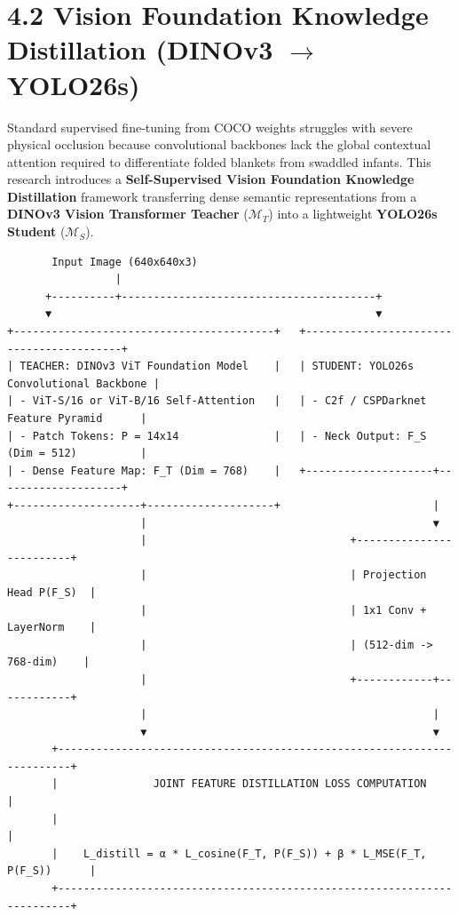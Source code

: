 \section{\texorpdfstring{4.2 Vision Foundation Knowledge Distillation
(DINOv3 \(\to\)
YOLO26s)}{4.2 Vision Foundation Knowledge Distillation (DINOv3 \textbackslash to YOLO26s)}}\label{vision-foundation-knowledge-distillation-dinov3-to-yolo26s}

Standard supervised fine-tuning from COCO weights struggles with severe
physical occlusion because convolutional backbones lack the global
contextual attention required to differentiate folded blankets from
swaddled infants. This research introduces a \textbf{Self-Supervised
Vision Foundation Knowledge Distillation} framework transferring dense
semantic representations from a \textbf{DINOv3 Vision Transformer
Teacher} (\(\mathcal{M}_T\)) into a lightweight \textbf{YOLO26s Student}
(\(\mathcal{M}_S\)).

\begin{verbatim}
       Input Image (640x640x3)
                 |
      +----------+----------------------------------------+
      ▼                                                   ▼
+-----------------------------------------+   +-----------------------------------------+
| TEACHER: DINOv3 ViT Foundation Model    |   | STUDENT: YOLO26s Convolutional Backbone |
| - ViT-S/16 or ViT-B/16 Self-Attention   |   | - C2f / CSPDarknet Feature Pyramid      |
| - Patch Tokens: P = 14x14               |   | - Neck Output: F_S (Dim = 512)          |
| - Dense Feature Map: F_T (Dim = 768)    |   +--------------------+--------------------+
+--------------------+--------------------+                        |
                     |                                             ▼
                     |                                +-------------------------+
                     |                                | Projection Head P(F_S)  |
                     |                                | 1x1 Conv + LayerNorm    |
                     |                                | (512-dim -> 768-dim)    |
                     |                                +------------+------------+
                     |                                             |
                     ▼                                             ▼
       +------------------------------------------------------------------------+
       |               JOINT FEATURE DISTILLATION LOSS COMPUTATION              |
       |                                                                        |
       |    L_distill = α * L_cosine(F_T, P(F_S)) + β * L_MSE(F_T, P(F_S))      |
       +------------------------------------------------------------------------+
\end{verbatim}

